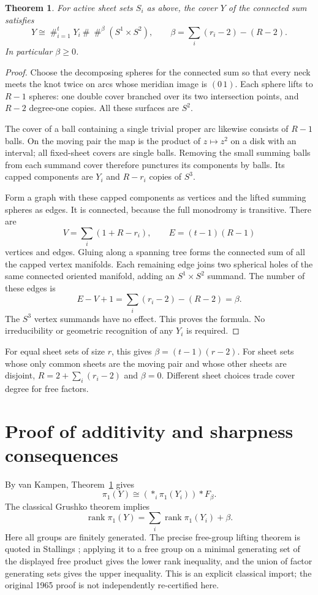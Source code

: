 \documentclass[11pt]{article}
\newtheorem{theorem}{Theorem}
\newcommand{\rank}{\operatorname{rank}}
\begin{document}
\begin{theorem}\label{thm:glue}
For active sheet sets $S_i$ as above, the cover $Y$ of the
connected sum satisfies
\[
 Y\cong\mathop{\#}_{i=1}^t Y_i\ \#\
       \mathop{\#}^{\beta}(S^1\times S^2),\qquad
 \beta=\sum_i(r_i-2)-(R-2).
\]
In particular $\beta\ge0$.
\end{theorem}
\begin{proof}
Choose the decomposing spheres for the connected sum so
that every neck meets the knot twice on arcs whose meridian
image is $(0\,1)$. Each sphere lifts to $R-1$ spheres:
one double cover branched over its two intersection points,
and $R-2$ degree-one copies. All these surfaces are $S^2$.

The cover of a ball containing a single trivial proper arc
likewise consists of $R-1$ balls. On the moving pair the
map is the product of $z\mapsto z^2$ on a disk with an
interval; all fixed-sheet covers are single balls.
Removing the small summing balls from each summand cover
therefore punctures its components by balls. Its capped
components are $Y_i$ and $R-r_i$ copies of $S^3$.

Form a graph with these capped components as vertices and
the lifted summing spheres as edges. It is connected, because
the full monodromy is transitive. There are
\[
 V=\sum_i(1+R-r_i),\qquad E=(t-1)(R-1)
\]
vertices and edges. Gluing along a spanning tree forms the
connected sum of all the capped vertex manifolds. Each
remaining edge joins two spherical holes of the same connected
oriented manifold, adding an $S^1\times S^2$ summand.
The number of these edges is
\[
 E-V+1=\sum_i(r_i-2)-(R-2)=\beta.
\]
The $S^3$ vertex summands have no effect. This proves the formula.
No irreducibility or geometric recognition of any $Y_i$ is required.
\end{proof}

For equal sheet sets of size $r$, this gives
$\beta=(t-1)(r-2)$. For sheet sets whose only common sheets
are the moving pair and whose other sheets are disjoint,
$R=2+\sum_i(r_i-2)$ and $\beta=0$.
Different sheet choices trade cover degree for free factors.

\section{Proof of additivity and sharpness consequences}

By van Kampen, Theorem~\ref{thm:glue} gives
\[
 \pi_1(Y)\cong\left(*_i\pi_1(Y_i)\right)*F_\beta.
\]
The classical Grushko theorem implies
\[
 \rank\pi_1(Y)=\sum_i\rank\pi_1(Y_i)+\beta.
\]
Here all groups are finitely generated. The precise
free-group lifting theorem is quoted in Stallings
\cite[Theorem 1.B.5]{stallings}; applying it to a free group
on a minimal generating set of the displayed free product
gives the lower rank inequality, and the union of factor
generating sets gives the upper inequality. This is an
explicit classical import; the original 1965 proof is not
independently re-certified here.
\end{document}
